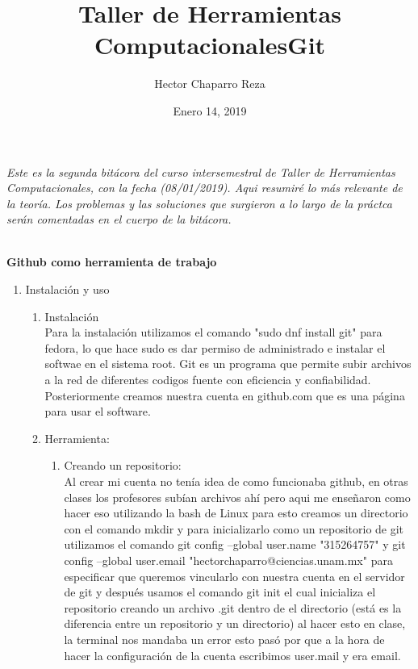 \documentclass[letterpaper, 12pt, oneside]{article}
\title{\Huge{Taller de Herramientas Computacionales}}
\author{Hector Chaparro Reza}
\date{Enero 14, 2019}
\begin{document}
	\maketitle
	\it Este es la segunda bit\'acora del curso intersemestral de Taller de Herramientas Computacionales, con la fecha (08/01/2019). Aqui resumir\'e lo m\'as relevante de la teor\'ia. Los problemas y las soluciones que surgieron a lo largo de la pr\'actca ser\'an comentadas en el cuerpo de la bit\'acora. 
	\newpage
	
	\title{\Huge{Git}}\\
	
	\textbf{Github como herramienta de trabajo}\\
	
	\begin{enumerate}
		\item {Instalaci\'on y uso}
		\begin{enumerate}
			\item Instalaci\'on\\
			Para la instalaci\'on utilizamos el comando "sudo dnf install git" para fedora, lo que hace sudo es dar permiso de administrado e instalar el softwae en el sistema root. Git es un programa que permite subir archivos a la red de diferentes codigos fuente con eficiencia y confiabilidad. Posteriormente creamos nuestra cuenta en github.com que es una p\'agina para usar el software.\\
			
			\item Herramienta:\\
			\begin{enumerate}
			\item Creando un repositorio:\\
			Al crear mi cuenta no ten\'ia idea de como funcionaba github, en otras clases los profesores sub\'ian archivos ah\'i pero aqui me enseñaron como hacer eso utilizando la bash de Linux para esto creamos un directorio con el comando mkdir y para inicializarlo como un repositorio de git utilizamos el comando git config --global user.name "315264757" y git config --global user.email "hectorchaparro@ciencias.unam.mx" para especificar que queremos  vincularlo con nuestra cuenta en el servidor de git y despu\'es usamos el comando git init el cual inicializa el repositorio creando un archivo .git dentro de el directorio (est\'a es la diferencia entre un repositorio y un directorio) al hacer esto en clase, la terminal nos mandaba un error esto pas\'o por que a la hora de hacer la configuraci\'on de la cuenta escribimos user.mail y era email. \\
			

\end{enumerate}
\end{enumerate}
\end{enumerate}
\end{document}
